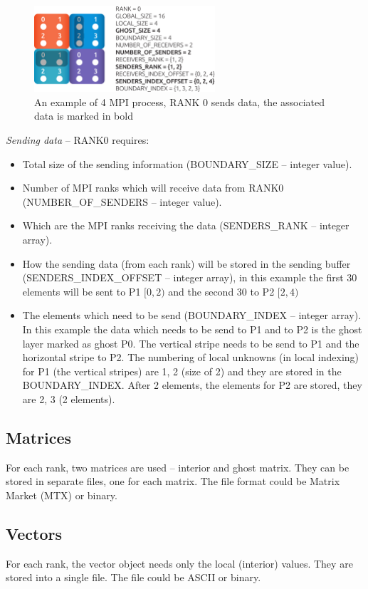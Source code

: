 \begin{figure}[!ht]
\centering
\includegraphics[width=0.6\textwidth]{./fig/mpi-4x4-domain5.pdf}
\caption{An example of 4 MPI process, RANK 0 sends data, the associated data is marked in bold}
\label{domain-io-sen}
\end{figure}

\emph{Sending data} -- RANK0 requires:
\begin{itemize}
  \item Total size of the sending information (BOUNDARY\_SIZE -- integer value). 
  \item Number of MPI ranks which will receive data from RANK0 (NUMBER\_OF\_SENDERS -- integer value).
  \item Which are the MPI ranks receiving the data (SENDERS\_RANK -- integer array).
  \item How the sending data (from each rank) will be stored in the sending buffer (SENDERS\_INDEX\_OFFSET -- integer array), in this example the first 30 elements will be sent to P1 $[0,2)$ and the second 30 to P2 $[2,4)$
  \item The elements which need to be send (BOUNDARY\_INDEX -- integer array). In this example the data which needs to be send to P1 and to P2 is the ghost layer marked as ghost P0. The vertical stripe needs to be send to P1 and the horizontal stripe to P2. The numbering of local unknowns (in local indexing) for P1 (the vertical stripes) are 1, 2 (size of 2) and they are stored in the BOUNDARY\_INDEX. After 2 elements, the elements for P2 are stored, they are 2, 3 (2 elements).
\end{itemize}

\subsection{Matrices}

For each rank, two matrices are used -- interior and ghost matrix. They can be stored in separate files, one for each matrix. The file format could be Matrix Market (MTX) or binary.

\subsection{Vectors}

For each rank, the vector object needs only the local (interior) values. They are stored into a single file. The file could be ASCII or binary.
